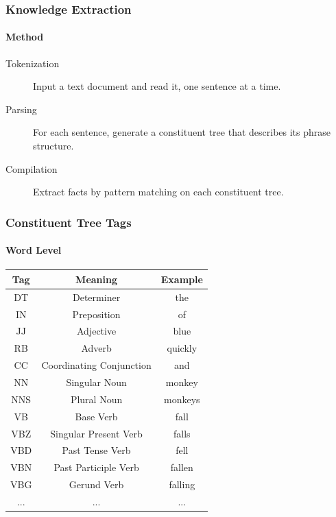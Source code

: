 \documentclass[mathserif, aspectratio=169]{beamer}
\begin{document}
\begin{frame}

\frametitle{Knowledge Extraction}
\framesubtitle{Method}

\begin{description}

\item[Tokenization] Input a text document and read it, one sentence at a time.
\item[Parsing] For each sentence, generate a constituent tree that describes its phrase structure.
\item[Compilation] Extract facts by pattern matching on each constituent tree.

\end{description}

\end{frame}


\begin{frame}

\frametitle{Constituent Tree Tags}
\framesubtitle{Word Level}

\centering

\begin{tabular}{c | c | c}
Tag & Meaning & Example \\
\hline
DT & Determiner & the \\
IN & Preposition & of\\
JJ & Adjective & blue\\
RB & Adverb & quickly\\
CC & Coordinating Conjunction & and \\
NN & Singular Noun & monkey\\
NNS & Plural Noun & monkeys\\
VB & Base Verb & fall\\
VBZ & Singular Present Verb & falls\\
VBD & Past Tense Verb & fell\\
VBN & Past Participle Verb & fallen\\
VBG & Gerund Verb & falling\\
... & ... & ...\\
\end{tabular}

\end{frame}
\end{document}
